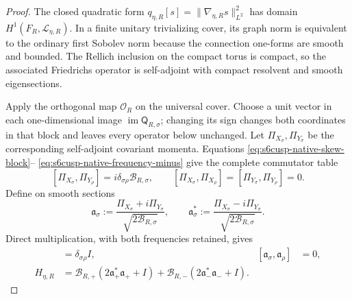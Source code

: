 \begin{proof}
The closed quadratic form
\(q_{\eta,R}[s]=\lVert\nabla_{\eta,R}s\rVert_{L^2}^2\) has domain
\(H^1(F_R,\mathcal L_{\eta,R})\).  In a finite unitary trivializing cover,
its graph norm is equivalent to the ordinary first Sobolev norm because the
connection one-forms are smooth and bounded.  The Rellich inclusion on the
compact torus is compact, so the associated Friedrichs operator is
self-adjoint with compact resolvent and smooth eigensections.

Apply the orthogonal map \(\mathscr O_R\) on the universal cover.  Choose a
unit vector in each one-dimensional image
\(\operatorname{im}\mathsf Q_{R,\sigma}\); changing its sign changes both
coordinates in that block and leaves every operator below unchanged.  Let
\(\Pi_{X_\sigma},\Pi_{Y_\sigma}\) be the corresponding self-adjoint
covariant momenta.  Equations
\eqref{eq:s6cusp-native-skew-block}--
\eqref{eq:s6cusp-native-frequency-minus} give the complete commutator table
\begin{equation}\label{eq:s6cusp-native-magnetic-commutators}
 [\Pi_{X_\sigma},\Pi_{Y_\rho}]
 =i\delta_{\sigma\rho}\mathcal B_{R,\sigma},
 \qquad
 [\Pi_{X_\sigma},\Pi_{X_\rho}]
 =[\Pi_{Y_\sigma},\Pi_{Y_\rho}]=0.
\end{equation}
Define on smooth sections
\begin{equation}\label{eq:s6cusp-native-ladders}
 \mathfrak a_\sigma
 :=\frac{\Pi_{X_\sigma}+i\Pi_{Y_\sigma}}
 {\sqrt{2\mathcal B_{R,\sigma}}},
 \qquad
 \mathfrak a_\sigma^*
 :=\frac{\Pi_{X_\sigma}-i\Pi_{Y_\sigma}}
 {\sqrt{2\mathcal B_{R,\sigma}}}.
\end{equation}
Direct multiplication, with both frequencies retained, gives
\begin{align}
 [\mathfrak a_\sigma,\mathfrak a_\rho^*]
 &=\delta_{\sigma\rho}I,
 &
 [\mathfrak a_\sigma,\mathfrak a_\rho]&=0,
 \label{eq:s6cusp-native-ladder-commutators}\\
 H_{\eta,R}
 &=\mathcal B_{R,+}
 (2\mathfrak a_+^*\mathfrak a_++I)
 +\mathcal B_{R,-}
 (2\mathfrak a_-^*\mathfrak a_-+I).
 \label{eq:s6cusp-native-oscillator-factorization}
\end{align}


\end{proof}
